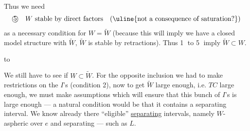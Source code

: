 Thus we need 
\[
\text{\textcircled{5}}\quad W\text{ stable by direct factors}\quad(\text{\uline{not a consequence of saturation?}})
\]
as a necessary condition for $W=\widetilde W$ (because this will imply we have a closed model structure with $\widetilde W$,  $\widetilde W$ is stable by retractions). Thus \textcircled{1} to \textcircled{5} imply $\widetilde W\subset W$.

 to



We still have to see if $W\subset\widetilde W$. For the opposite inclusion we had to make restrictions  on the $I$'s (condition 2), now to get $\widetilde W$ large enough, i.e. $TC$ large enough, we must make assumptions which will ensure that this bunch of $I$'s is large enough --- a natural condition would be that it contains a separating interval. We know already there   ``eligible'' \uline{separating} intervals, namely $W$-aspheric over $e$ and separating --- such as $L$.

